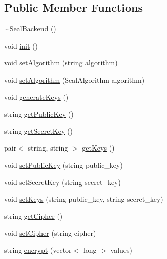 \subsection*{Public Member Functions}
\begin{DoxyCompactItemize}
\item 
\mbox{\hyperlink{classhomomorphine_1_1_seal_backend_a7224092a19a3472a5143d16b80fb9775}{$\sim$\+Seal\+Backend}} ()
\item 
void \mbox{\hyperlink{classhomomorphine_1_1_seal_backend_a106556100ae5f2e9dadfa9fc64603d94}{init}} ()
\item 
void \mbox{\hyperlink{classhomomorphine_1_1_seal_backend_a46a336bca80c5450a1f3ea1125d0d0e8}{set\+Algorithm}} (string algorithm)
\item 
void \mbox{\hyperlink{classhomomorphine_1_1_seal_backend_aaf2100eb13b4434bc0136ff00578bb8d}{set\+Algorithm}} (Seal\+Algorithm algorithm)
\item 
void \mbox{\hyperlink{classhomomorphine_1_1_seal_backend_a1e2ed46b896d4a5b5d930ec7bcd3207b}{generate\+Keys}} ()
\item 
string \mbox{\hyperlink{classhomomorphine_1_1_seal_backend_aa2dce269303eaa73c62dbfacce66dc1a}{get\+Public\+Key}} ()
\item 
string \mbox{\hyperlink{classhomomorphine_1_1_seal_backend_a8ad57a68eb8a02d162ba439046565471}{get\+Secret\+Key}} ()
\item 
pair$<$ string, string $>$ \mbox{\hyperlink{classhomomorphine_1_1_seal_backend_a30358e6405e2d1470468cf55aefb3f4d}{get\+Keys}} ()
\item 
void \mbox{\hyperlink{classhomomorphine_1_1_seal_backend_a6d34008acb06ff1d6743f9163fcd41fb}{set\+Public\+Key}} (string public\+\_\+key)
\item 
void \mbox{\hyperlink{classhomomorphine_1_1_seal_backend_aa9fd3331b2c710e8fdfc3385bbf11eb5}{set\+Secret\+Key}} (string secret\+\_\+key)
\item 
void \mbox{\hyperlink{classhomomorphine_1_1_seal_backend_a42afcc2823d616edc6be0e3950cf7196}{set\+Keys}} (string public\+\_\+key, string secret\+\_\+key)
\item 
string \mbox{\hyperlink{classhomomorphine_1_1_seal_backend_a0917c586791e74b83f4ca0932e5e4d8e}{get\+Cipher}} ()
\item 
void \mbox{\hyperlink{classhomomorphine_1_1_seal_backend_a866b58e41809d68d4c6ed8c3afb27712}{set\+Cipher}} (string cipher)
\item 
string \mbox{\hyperlink{classhomomorphine_1_1_seal_backend_a0c9f992fb7626e55ad0bbfcc068e8e43}{encrypt}} (vector$<$ long $>$ values)

\end{DoxyCompactItemize}
